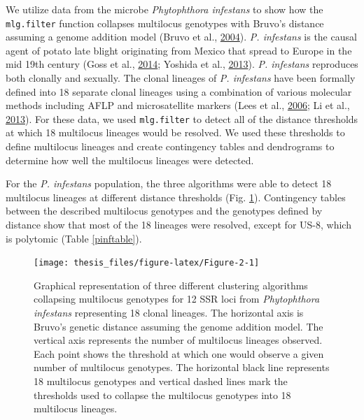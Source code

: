 \documentclass[double,12pt]{beavtex}
\begin{document}
  We utilize data from the microbe \emph{Phytophthora infestans} to show
  how the \texttt{mlg.filter} function collapses multilocus genotypes with
  Bruvo's distance assuming a genome addition model (Bruvo et al.,
  \protect\hyperlink{ref-bruvo2004simple}{2004}). \emph{P. infestans} is
  the causal agent of potato late blight originating from Mexico that
  spread to Europe in the mid 19th century (Goss et al.,
  \protect\hyperlink{ref-goss2014irish}{2014}; Yoshida et al.,
  \protect\hyperlink{ref-yoshida2013rise}{2013}). \emph{P. infestans}
  reproduces both clonally and sexually. The clonal lineages of \emph{P.
  infestans} have been formally defined into 18 separate clonal lineages
  using a combination of various molecular methods including AFLP and
  microsatellite markers (Lees et al.,
  \protect\hyperlink{ref-lees2006novel}{2006}; Li et al.,
  \protect\hyperlink{ref-li2013efficient}{2013}). For these data, we used
  \texttt{mlg.filter} to detect all of the distance thresholds at which 18
  multilocus lineages would be resolved. We used these thresholds to
  define multilocus lineages and create contingency tables and dendrograms
  to determine how well the multilocus lineages were detected.
  
  For the \emph{P. infestans} population, the three algorithms were able
  to detect 18 multilocus lineages at different distance thresholds (Fig.
  \ref{fig:Figure-2}). Contingency tables between the described multilocus
  genotypes and the genotypes defined by distance show that most of the 18
  lineages were resolved, except for US-8, which is polytomic (Table
  \ref{pinftable}).
  
  \begin{figure}
  
  {\centering \texttt{[image: thesis\_files/figure-latex/Figure-2-1]} 
  
  }
  
  \caption[Graphical representation of three different clustering algorithms
  collapsing multilocus genotypes for 12 SSR loci from \emph{Phytophthora
  infestans} representing 18 clonal lineages.]{Graphical representation of three different clustering algorithms
  collapsing multilocus genotypes for 12 SSR loci from \emph{Phytophthora
  infestans} representing 18 clonal lineages. The horizontal axis is
  Bruvo's genetic distance assuming the genome addition model. The
  vertical axis represents the number of multilocus lineages observed.
  Each point shows the threshold at which one would observe a given number
  of multilocus genotypes. The horizontal black line represents 18
  multilocus genotypes and vertical dashed lines mark the thresholds used
  to collapse the multilocus genotypes into 18 multilocus lineages.}\label{fig:Figure-2}
  \end{figure}
  
\end{document}

